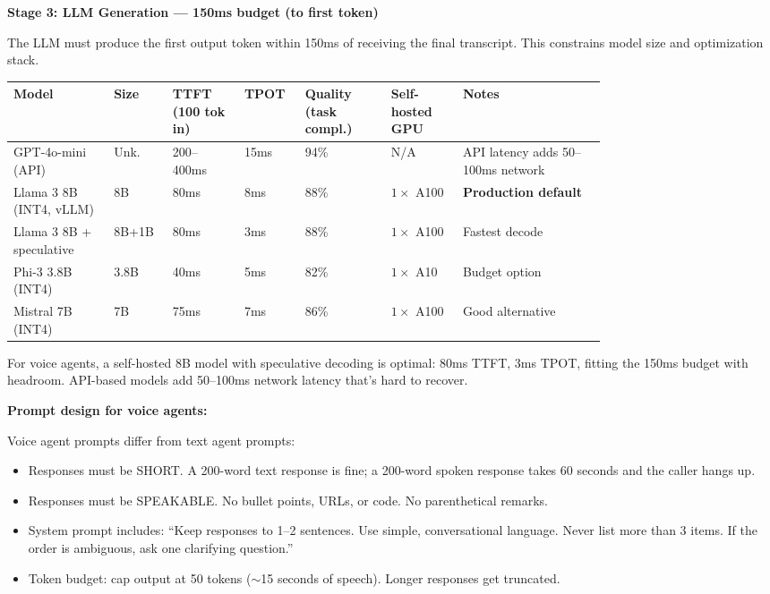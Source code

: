 \textbf{Stage 3: LLM Generation --- 150ms budget (to first token)}

The LLM must produce the first output token within 150ms of receiving the final transcript. This constrains model size and optimization stack.

{\small
\begin{tabular}{|p{0.14\linewidth}|p{0.05\linewidth}|p{0.1\linewidth}|p{0.06\linewidth}|p{0.12\linewidth}|p{0.1\linewidth}|p{0.2\linewidth}|}
\hline
\textbf{Model} & \textbf{Size} & \textbf{TTFT (100 tok in)} & \textbf{TPOT} & \textbf{Quality (task compl.)} & \textbf{Self-hosted GPU} & \textbf{Notes} \\
\hline
GPT-4o-mini (API) & Unk. & 200--400ms & 15ms & 94\% & N/A & API latency adds 50--100ms network \\
\hline
Llama 3 8B (INT4, vLLM) & 8B & 80ms & 8ms & 88\% & $1\times$ A100 & \textbf{Production default} \\
\hline
Llama 3 8B + speculative & 8B+1B & 80ms & 3ms & 88\% & $1\times$ A100 & Fastest decode \\
\hline
Phi-3 3.8B (INT4) & 3.8B & 40ms & 5ms & 82\% & $1\times$ A10 & Budget option \\
\hline
Mistral 7B (INT4) & 7B & 75ms & 7ms & 86\% & $1\times$ A100 & Good alternative \\
\hline
\end{tabular}
}

\bigskip
For voice agents, a self-hosted 8B model with speculative decoding is optimal: 80ms TTFT, 3ms TPOT, fitting the 150ms budget with headroom. API-based models add 50--100ms network latency that's hard to recover.

\textbf{Prompt design for voice agents:}

Voice agent prompts differ from text agent prompts:
\begin{itemize}
  \item Responses must be SHORT. A 200-word text response is fine; a 200-word spoken response takes 60 seconds and the caller hangs up.
  \item Responses must be SPEAKABLE. No bullet points, URLs, or code. No parenthetical remarks.
  \item System prompt includes: ``Keep responses to 1--2 sentences. Use simple, conversational language. Never list more than 3 items. If the order is ambiguous, ask one clarifying question.''
  \item Token budget: cap output at 50 tokens ($\sim$15 seconds of speech). Longer responses get truncated.
\end{itemize}

